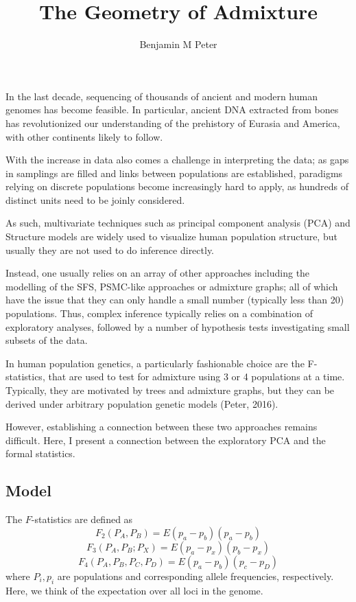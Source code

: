 \documentclass[9pt,twocolumn,twoside,lineno]{pnas-new}
\title{The Geometry of Admixture}
\author[a,1]{Benjamin M Peter}
\affil[a]{Affiliation One}
\begin{document}
\maketitle
\thispagestyle{firststyle}

In the last decade, sequencing of thousands of ancient and modern human genomes has become feasible. In particular, ancient DNA extracted from bones has revolutionized our understanding of the prehistory of Eurasia and America,  with other continents likely to follow. 

With the increase in data also comes a challenge in interpreting the data; as gaps in samplings are filled and links between populations are established, paradigms relying on discrete populations become increasingly hard to apply, as hundreds of distinct units need to be joinly considered. 

As such, multivariate techniques such as principal component analysis (PCA) and Structure models are widely used to visualize human population structure, but usually they are not used to do inference directly.

Instead, one usually relies on an array of other approaches including the modelling of the SFS, PSMC-like approaches or admixture graphs; all of which have the issue that they can only handle a small number (typically less than 20) populations. Thus, complex inference typically relies on a combination of exploratory analyses, followed by a number of hypothesis tests investigating small subsets of the data. 

In human population genetics, a particularly fashionable choice are the F-statistics, that are used to test for admixture using 3 or 4 populations at a time. Typically, they are motivated by trees and admixture graphs, but they can be derived under arbitrary population genetic models (Peter, 2016).

However, establishing a connection between these two approaches remains difficult. 
Here, I present a connection between the exploratory PCA and the formal statistics. 

\subsection*{Model}
The $F$-statistics are defined as 
$$F_2(P_A, P_B) = E(p_a - p_b)(p_a - p_b)$$
$$F_3(P_A, P_B; P_X) = E(p_a - p_x)(p_b - p_x)$$
$$F_4(P_A, P_B, P_C, P_D) = E(p_a - p_b)(p_c - p_D)$$
where $P_i, p_i$ are populations and corresponding allele frequencies, respectively. Here, we think of the expectation over all loci in the genome.
\end{document}
